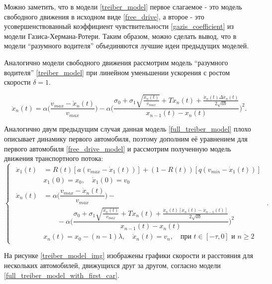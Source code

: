 \documentclass[12pt, a4paper]{extarticle}
\numberwithin{equation}{section}
\numberwithin{figure}{section}
\begin{document}
Можно заметить, что в модели \eqref{treiber_model} первое слагаемое - это модель свободного движения в исходном виде \eqref{free_drive}, а второе - это усовершенствованный коэффициент чувствительности \eqref{gazis_coefficient} из модели Газиса-Хермана-Ротери. Таким образом, можно сделать вывод, что в модели ``разумного водителя'' объединяются лучшие идеи предыдущих моделей.

Аналогично модели свободного движения рассмотрим модель ``разумного водителя'' \eqref{treiber_model} при линейном уменьшении ускорения с ростом скорости $\delta=1$.

\begin{equation} \label{full_treiber_model}
\ddot{x}_n(t)= \alpha\bigg(\dfrac{v_{max}-\dot{x}_n(t)}{v_{max}} \bigg) - \alpha\bigg( \dfrac{\sigma_0+\sigma_1\sqrt{\frac{ \dot{x}_n(t)}{v_{max}}} +T \dot{x}_n(t)+ \frac{ \dot{x}_n(t)\Delta \dot{x}_n(t) }{2\sqrt{ab}}}{x_{n-1}(t)-x_n(t)}\bigg)^2.
\end{equation}

Аналогично двум предыдущим случая данная модель \eqref{full_treiber_model} плохо описывает динамику первого автомобиля, поэтому дополним её уравнением для первого автомобиля \eqref{free_drive_model} и рассмотрим полученную модель движения транспортного потока:
\begin{equation} \label{full_treiber_model_with_first_car} 
\begin{cases}
\begin{split}
\ddot{x}_1(t)& = R(t) \left[ a\left(v_{max}-\dot{x}_1(t) \right)\right] + (1-R(t)) \left[ q\left( v_{min} - \dot{x}_1(t)\right) \right] \\
&x_{1}(0)=x_0, \quad \dot{x}_{1}(0)=v_{0}\\
\ddot{x}_n(t)& = \alpha\bigg(\dfrac{v_{max}-\dot{x}_n(t)}{v_{max}} \bigg) - \\ & \quad \quad -\alpha\bigg( \dfrac{\sigma_0+\sigma_1\sqrt{\frac{ \dot{x}_n(t)}{v_{max}}} +T \dot{x}_n(t)+ \frac{ \dot{x}_n(t)\left[ \dot{x}_n(t)-\dot{x}_{n-1}(t)\right]  }{2\sqrt{ab}}}{x_{n-1}(t)-x_n(t)}\bigg)^2 \\
&x_n(t)=x_0-(n-1)\lambda, \quad \dot{x}_n(t)=v_{n}, \quad \text{при } t \in [-\tau,0] \text{ и } n\geq2
\end{split}
\end{cases}.
\end{equation}

На рисунке \ref{treiber_model_img} изображены графики скорости и расстояния для нескольких автомобилей, движущихся друг за другом, согласно модели \eqref{full_treiber_model_with_first_car}.
\end{document}

